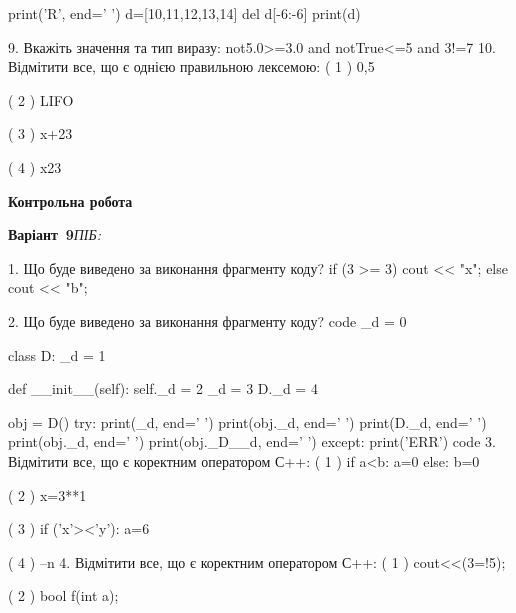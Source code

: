 \documentclass[11pt]{article}
\begin{document}
print('R', end=' ')
d=[10,11,12,13,14]
del d[-6:-6]
print(d)

\vspace{5mm}
9. 
Вкажіть значення та тип виразу:
not5.0>=3.0 and notTrue<=5 and 3!=7
\vspace{5mm}
10. %
Відмітити все, що є однією правильною лексемою:
( 1 ) 0,5

( 2 ) LIFO

( 3 ) x+23

( 4 ) x23
\vspace{5mm}










\newpage

\newpage

{\large\textbf{Контрольна робота}}

\textbf{Варіант \No\,9}\hfill \textit{ПІБ:}\,\underline{\hspace{60mm}}
\vspace{4mm}

1. Що буде виведено за виконання фрагменту коду?
if (3 >= 3)
    cout << "x";
else
    cout << "b";

\vspace{5mm}
2. Що буде виведено за виконання фрагменту коду?
code
_d = 0

class D:
    _d = 1
    
    def __init__(self):
        self._d = 2
        _d = 3
        D._d = 4

obj = D()
try:
    print(_d, end=' ')
    print(obj._d, end=' ')
    print(D._d, end=' ')
    print(obj._d, end=' ')
    print(obj._D__d, end=' ')
except:
    print('ERR')
code
\vspace{5mm}
3. %
Відмітити все, що є коректним оператором С++:
( 1 ) if a<b: a=0 else: b=0

( 2 ) x=3**1

( 3 ) if ('x'><'y'): a=6

( 4 ) --n
\vspace{5mm}
4. %
Відмітити все, що є коректним оператором С++:
( 1 ) cout<<(3=!5);

( 2 ) bool f(int a);
\end{document}
